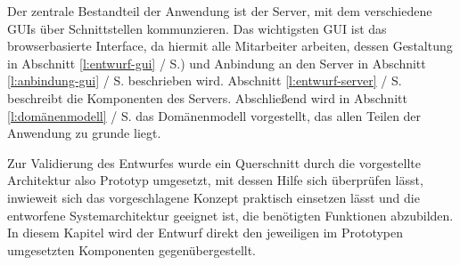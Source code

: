 Der zentrale Bestandteil der Anwendung ist der Server, mit dem verschiedene GUIs über Schnittstellen kommunzieren. Das wichtigsten GUI ist das browserbasierte Interface, da hiermit alle Mitarbeiter arbeiten, dessen Gestaltung in Abschnitt \ref{l:entwurf-gui} / S.\pageref{l:entwurf-gui}) und Anbindung an den Server in Abschnitt \ref{l:anbindung-gui} / S.\pageref{l:anbindung-gui} beschrieben wird. Abschnitt \ref{l:entwurf-server} / S.\pageref{l:entwurf-server} beschreibt die Komponenten des Servers. Abschließend wird in Abschnitt \ref{l:domänenmodell} / S.\pageref{l:domänenmodell} das Domänenmodell vorgestellt, das allen Teilen der Anwendung zu grunde liegt.

Zur Validierung des Entwurfes wurde ein Querschnitt durch die vorgestellte Architektur also Prototyp umgesetzt, mit dessen Hilfe sich überprüfen lässt, inwieweit sich das vorgeschlagene Konzept praktisch einsetzen lässt und die entworfene Systemarchitektur geeignet ist, die benötigten Funktionen abzubilden. In diesem Kapitel wird der Entwurf direkt den jeweiligen im Prototypen umgesetzten Komponenten gegenübergestellt.

















\pagebreak
